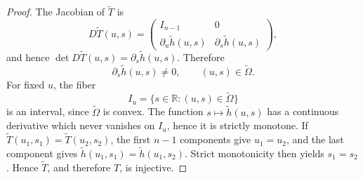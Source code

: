 \documentclass[10pt,a4paper]{amsart}
\begin{document}
\begin{proof}
The Jacobian of \(\widetilde T\) is
\[
D\widetilde T(u,s)=
\begin{pmatrix}
I_{n-1} & 0\\
\partial_u\widetilde h(u,s) & \partial_s\widetilde h(u,s)
\end{pmatrix},
\]
and hence \(\det D\widetilde T(u,s)=\partial_s\widetilde h(u,s)\). Therefore
\[
\partial_s\widetilde h(u,s)\ne0,
\qquad (u,s)\in\widetilde\Omega.
\]
For fixed \(u\), the fiber
\[
I_u=\{s\in\mathbb R:(u,s)\in\widetilde\Omega\}
\]
is an interval, since \(\widetilde\Omega\) is convex. The function \(s\mapsto\widetilde h(u,s)\) has a continuous derivative which never vanishes on \(I_u\), hence it is strictly monotone. If \(\widetilde T(u_1,s_1)=\widetilde T(u_2,s_2)\), the first \(n-1\) components give \(u_1=u_2\), and the last component gives \(\widetilde h(u_1,s_1)=\widetilde h(u_1,s_2)\). Strict monotonicity then yields \(s_1=s_2\). Hence \(\widetilde T\), and therefore \(T\), is injective.
\end{proof}
\end{document}
